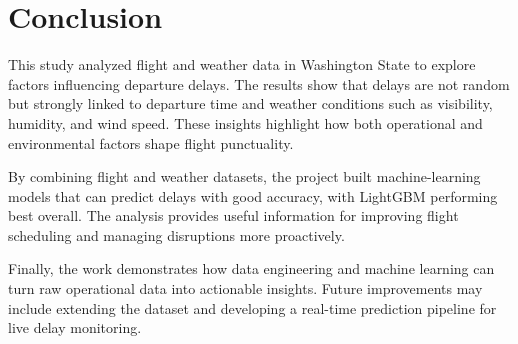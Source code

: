 \documentclass[a4paper,12pt]{report}
\begin{document}
\chapter*{Conclusion}

This study analyzed flight and weather data in Washington State to explore factors influencing departure delays. The results show that delays are not random but strongly linked to departure time and weather conditions such as visibility, humidity, and wind speed. These insights highlight how both operational and environmental factors shape flight punctuality.

By combining flight and weather datasets, the project built machine-learning models that can predict delays with good accuracy, with LightGBM performing best overall. The analysis provides useful information for improving flight scheduling and managing disruptions more proactively.

Finally, the work demonstrates how data engineering and machine learning can turn raw operational data into actionable insights. Future improvements may include extending the dataset and developing a real-time prediction pipeline for live delay monitoring.
\end{document}
